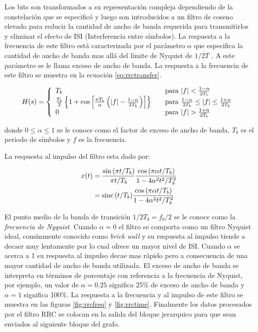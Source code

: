 Los bits son transformados a su representaci\'on compleja dependiendo de la constelaci\'on que se
especific\'o y luego son introducidos a un filtro de coseno elevado para
reducir la cantidad de ancho de banda requerida para transmitirlos y eliminar el efecto de ISI
(Interferencia entre s\'imbolos). La respuesta a la frecuencia de este filtro est\'a caracterizada
por el par\'ametro $\alpha$ que especifica la cantidad de ancho de banda mas all\'a del l\'imite de
Nyquist de $1/2T$ \cite{sklar}. A este par\'ametro se le llama exceso de ancho de banda. La
respuesta a la frecuencia de este filtro se muestra en la ecuaci\'on \ref{eq:rrctransfer}.

\begin{equation}\label{eq:rrctransfer}
H(s)=\left\{
\begin{array}{l l}
T_b & \quad \text{para $|f| < \frac{1-\alpha}{2T_b}$}\\
\frac{T_b}{2}\left\{1+\cos{\left[\frac{\pi
T_b}{\alpha}\left(|f|-\frac{1-\alpha}{2T_b}\right)\right]}\right\} & \quad \text{para
$\frac{1-\alpha}{2T_b} \leq |f| \leq \frac{1+\alpha}{2T_b}$}\\ 0 & \quad \text{para $|f| >
\frac{1+\alpha}{2T_b}$} \end{array}\right.
\end{equation}

donde $0 \leq \alpha \leq 1$ se le conoce como el factor de exceso de ancho de banda, $T_b$ es el
periodo de s\'imbolos y $f$ es la frecuencia. 

La respuesta al impulso del filtro esta dado por:

\begin{align}\label{eq:imptransfer}
x(t)&=\frac{\sin{(\pi t/T_b)}}{\pi t/T_b}\frac{\cos{(\pi\alpha t/T_b)}}{1-4\alpha^2t^2/T_b^2}
\nonumber \\ 
&=\operatorname{sinc}{(t/T_b)}\frac{\cos{(\pi \alpha t/T_b)}}{1-4\alpha^2t^2/T_b^2}
\end{align}

El punto medio de la banda de transici\'on $1/2T_b=f_b/2$ se le conoce como la \emph{frecuencia de
Nyquist}. Cuando $\alpha=0$ el filtro se comporta como un filtro Nyquist ideal, com\'unmente
conocido como \emph{brick wall} y su respuesta al impulso tiende a decaer muy lentamente por lo
cual ofrece un mayor nivel de ISI. Cuando $\alpha$ se acerca a 1 su respuesta al impulso decae mas
r\'apido pero a consecuencia de una mayor cantidad de ancho de banda utilizada. El exceso de ancho
de banda se interpreta en t\'erminos de porcentaje con referencia a la frecuencia de Nyquist, por
ejemplo, un valor de $\alpha=0.25$ significa 25\% de exceso de ancho de banda y $\alpha=1$
significa 100\%. La respuesta a la frecuencia y al impulso de este filtro se muestra en las figuras
\ref{fig:rrcfreq} y \ref{fig:rrctime}. Finalmente los datos procesados por el filtro RRC se colocan en la salida del bloque
jerarquico para que sean enviados al siguiente bloque del grafo. 


